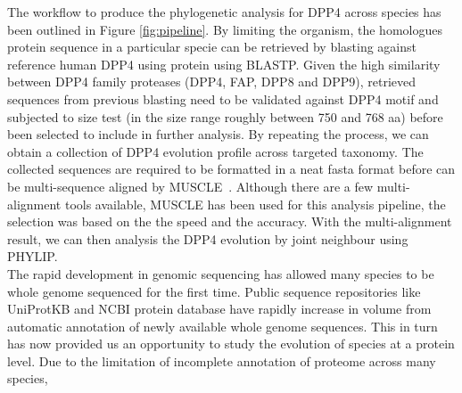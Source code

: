 The workflow to produce the phylogenetic analysis for DPP4 across species has been outlined in Figure \ref{fig:pipeline}. By limiting the organism, the homologues protein sequence in a particular specie can be retrieved by blasting against reference human DPP4 using protein using BLASTP. Given the high similarity between DPP4 family proteases (DPP4, FAP, DPP8 and DPP9), retrieved sequences from previous blasting need to be validated against DPP4 motif and subjected to size test (in the size range roughly between 750 and 768 aa) before been selected to include in further analysis. By repeating the process, we can obtain a collection of DPP4 evolution profile across targeted taxonomy. The collected sequences are required to be formatted in a neat fasta format before can be multi-sequence aligned by MUSCLE~\cite{15318951}. Although there are a few multi-alignment tools available, MUSCLE has been used for this analysis pipeline, the selection was based on the the speed and the accuracy. With the multi-alignment result, we can then analysis the DPP4 evolution by joint neighbour using PHYLIP. \\

The rapid development in genomic sequencing has allowed many species to be whole genome sequenced for the first time. Public sequence repositories like UniProtKB and NCBI protein database have rapidly increase in volume from automatic annotation of newly available whole genome sequences. This in turn has now provided us an opportunity to study the evolution of species at a protein level.  Due to the limitation of incomplete annotation of proteome across many species, 